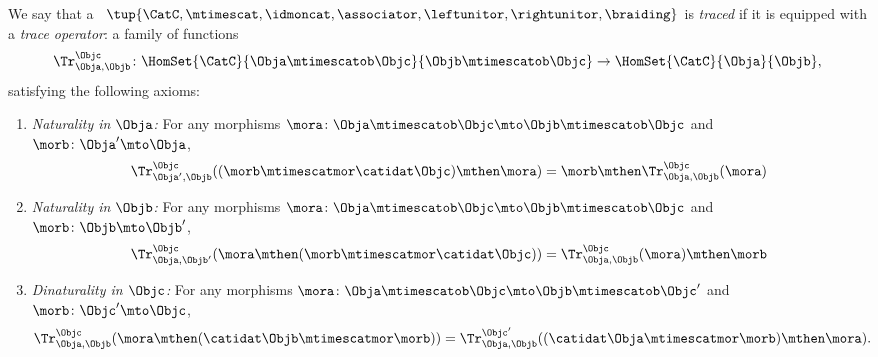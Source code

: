 \begin{ctdefinition}
    \label{def:traced-monoidal-cat}
    \label{def:traced-monoidal-category}
    We say that a ~$\tup{\CatC, \mtimescat, \idmoncat, \associator, \leftunitor, \rightunitor, \braiding}$ is \emph{traced} if it is equipped with a \emph{trace operator}: a family of functions
    \begin{equation}
        \Tr_{\Obja,\Objb}^\Objc\colon \HomSet{\CatC}{\Obja \mtimescatob \Objc}{\Objb\mtimescatob \Objc}\to \HomSet{\CatC}{\Obja}{\Objb},
    \end{equation}
    satisfying the following axioms:
    \begin{enumerate}
        \item \emph{Naturality in $\Obja$:} For any morphisms $\mora\colon \Obja\mtimescatob \Objc \mto \Objb\mtimescatob \Objc$ and $\morb \colon \Obja' \mto \Obja$,
              \begin{equation}\label{eq:trace-naturality-1}
                  \Tr_{\Obja', \Objb}^\Objc ( (\morb \mtimescatmor \catidat\Objc) \mthen \mora) = \morb \mthen \Tr_{\Obja, \Objb}^\Objc (\mora)
              \end{equation}
        \item \emph{Naturality in $\Objb$:} For any morphisms $\mora\colon \Obja\mtimescatob \Objc \mto \Objb\mtimescatob \Objc$ and $\morb \colon \Objb \mto \Objb'$,
              \begin{equation}\label{eq:trace-naturality-2}
                  \Tr_{\Obja, \Objb'}^\Objc ( \mora \mthen (\morb \mtimescatmor \catidat\Objc) ) = \Tr_{\Obja, \Objb}^\Objc (\mora) \mthen \morb
              \end{equation}
        \item \emph{Dinaturality in $\Objc$:}
              For any morphisms $\mora \colon \Obja  \mtimescatob \Objc \mto \Objb \mtimescatob \Objc'$ and $\morb \colon \Objc' \mto \Objc$,
              \begin{equation}\label{eq:trace-dinaturality}
                  \Tr_{\Obja, \Objb}^{\Objc} (\mora \mthen (\catidat\Objb \mtimescatmor \morb)) = \Tr_{\Obja, \Objb}^{\Objc'}((\catidat\Obja \mtimescatmor \morb) \mthen \mora).
              \end{equation}


\end{enumerate}
\end{ctdefinition}
